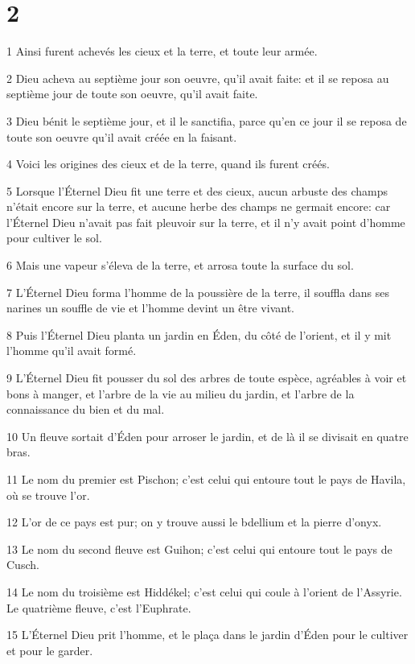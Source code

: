 \chapter{2}

\par 1 Ainsi furent achevés les cieux et la terre, et toute leur armée.
\par 2 Dieu acheva au septième jour son oeuvre, qu'il avait faite: et il se reposa au septième jour de toute son oeuvre, qu'il avait faite.
\par 3 Dieu bénit le septième jour, et il le sanctifia, parce qu'en ce jour il se reposa de toute son oeuvre qu'il avait créée en la faisant.
\par 4 Voici les origines des cieux et de la terre, quand ils furent créés.
\par 5 Lorsque l'Éternel Dieu fit une terre et des cieux, aucun arbuste des champs n'était encore sur la terre, et aucune herbe des champs ne germait encore: car l'Éternel Dieu n'avait pas fait pleuvoir sur la terre, et il n'y avait point d'homme pour cultiver le sol.
\par 6 Mais une vapeur s'éleva de la terre, et arrosa toute la surface du sol.
\par 7 L'Éternel Dieu forma l'homme de la poussière de la terre, il souffla dans ses narines un souffle de vie et l'homme devint un être vivant.
\par 8 Puis l'Éternel Dieu planta un jardin en Éden, du côté de l'orient, et il y mit l'homme qu'il avait formé.
\par 9 L'Éternel Dieu fit pousser du sol des arbres de toute espèce, agréables à voir et bons à manger, et l'arbre de la vie au milieu du jardin, et l'arbre de la connaissance du bien et du mal.
\par 10 Un fleuve sortait d'Éden pour arroser le jardin, et de là il se divisait en quatre bras.
\par 11 Le nom du premier est Pischon; c'est celui qui entoure tout le pays de Havila, où se trouve l'or.
\par 12 L'or de ce pays est pur; on y trouve aussi le bdellium et la pierre d'onyx.
\par 13 Le nom du second fleuve est Guihon; c'est celui qui entoure tout le pays de Cusch.
\par 14 Le nom du troisième est Hiddékel; c'est celui qui coule à l'orient de l'Assyrie. Le quatrième fleuve, c'est l'Euphrate.
\par 15 L'Éternel Dieu prit l'homme, et le plaça dans le jardin d'Éden pour le cultiver et pour le garder.
